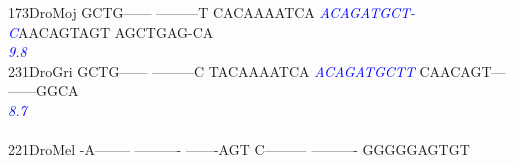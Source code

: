 \documentclass[11pt,twoside,reqno,a4paper]{article}
\begin{document}
{173\hspace*{1\charwidth}DroMoj	GCTG------	---------T	CACAAAATCA	\textit{\textcolor{blue}{A}}\textit{\textcolor{blue}{C}}\textit{\textcolor{blue}{A}}\textit{\textcolor{blue}{G}}\textit{\textcolor{blue}{A}}\textit{\textcolor{blue}{T}}\textit{\textcolor{blue}{G}}\textit{\textcolor{blue}{C}}\textit{\textcolor{blue}{T}}\textit{\textcolor{blue}{-}}	\textit{\textcolor{blue}{C}}AACAGTAGT	AGCTGAG-CA	\\
\hspace*{4\charwidth}\hspace*{7\charwidth}\hspace*{1\charwidth}\hspace*{1\charwidth}\hspace*{1\charwidth}\hspace*{30\charwidth}\textit{\textcolor{blue}{9.8}}\hspace*{1\charwidth}\hspace*{1\charwidth}\hspace*{1\charwidth}\\
231\hspace*{1\charwidth}DroGri	GCTG------	---------C	TACAAAATCA	\textit{\textcolor{blue}{A}}\textit{\textcolor{blue}{C}}\textit{\textcolor{blue}{A}}\textit{\textcolor{blue}{G}}\textit{\textcolor{blue}{A}}\textit{\textcolor{blue}{T}}\textit{\textcolor{blue}{G}}\textit{\textcolor{blue}{C}}\textit{\textcolor{blue}{T}}\textit{\textcolor{blue}{T}}	CAACAGT---	------GGCA	\\
\hspace*{4\charwidth}\hspace*{7\charwidth}\hspace*{1\charwidth}\hspace*{1\charwidth}\hspace*{1\charwidth}\hspace*{30\charwidth}\textit{\textcolor{blue}{8.7}}\hspace*{1\charwidth}\hspace*{1\charwidth}\hspace*{1\charwidth}\\
\\
221\hspace*{1\charwidth}DroMel	-A--------	----------	-------AGT	C---------	----------	GGGGGAGTGT	\\
\hspace*{4\charwidth}\hspace*{7\charwidth}\hspace*{1\charwidth}\hspace*{1\charwidth}\hspace*{1\charwidth}\hspace*{1\charwidth}\hspace*{1\charwidth}\hspace*{1\charwidth}\\
}
\end{document}
